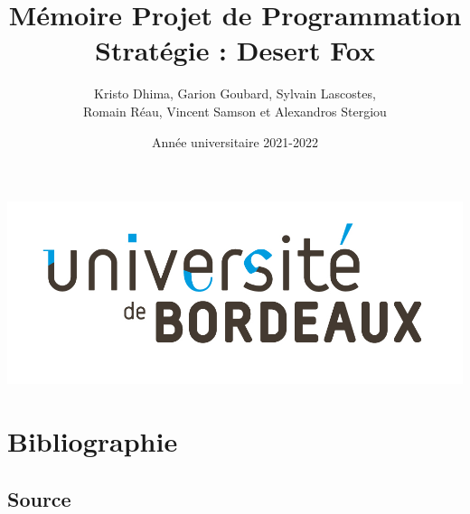 \documentclass{article}[a4paper, 12pt]
\title{\LARGE \textbf{Mémoire Projet de Programmation  } \\ \Large \textbf{Stratégie : Desert Fox}}
\author{Kristo Dhima, Garion Goubard, Sylvain Lascostes, \\Romain Réau, Vincent Samson et Alexandros Stergiou }
\date{Année universitaire 2021-2022}
\begin{document}
\maketitle
\begin{center}
    \center
    \includegraphics[scale=0.2]{data/Universite_Bordeaux_RVB-10.jpg}

\end{center}





\newpage
\tableofcontents %


\newpage



\newpage


\newpage







\section{Bibliographie}




\subsection{Source}


\end{document}
